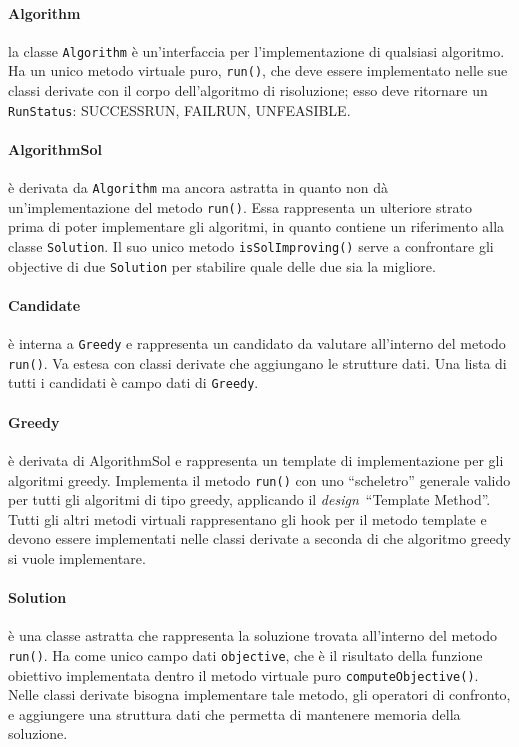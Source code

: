 \paragraph{Algorithm} la classe \texttt{Algorithm} è un'interfaccia per l'implementazione di qualsiasi algoritmo. Ha un unico metodo virtuale puro, \texttt{run()}, che deve essere implementato nelle sue classi derivate con il corpo dell'algoritmo di risoluzione; esso deve ritornare un \texttt{RunStatus}: SUCCESS\textunderscore RUN, FAIL\textunderscore RUN, UNFEASIBLE.
\paragraph{AlgorithmSol} è derivata da \texttt{Algorithm} ma ancora astratta in quanto non dà un'implementazione del metodo \texttt{run()}. Essa rappresenta un ulteriore strato prima di poter implementare gli algoritmi, in quanto contiene un riferimento alla classe \texttt{Solution}. Il suo unico metodo \texttt{isSolImproving()} serve a confrontare gli objective di due \texttt{Solution} per stabilire quale delle due sia la migliore.
\paragraph{Candidate} è interna a \texttt{Greedy} e rappresenta un candidato da valutare all'interno del metodo \texttt{run()}. Va estesa con classi derivate che aggiungano le strutture dati. Una lista di tutti i candidati è campo dati di \texttt{Greedy}.
\paragraph{Greedy} è derivata di AlgorithmSol e rappresenta un template di implementazione per gli algoritmi greedy. Implementa il metodo \texttt{run()} con uno ``scheletro'' generale valido per tutti gli algoritmi di tipo greedy, applicando il \emph{\gls{design}}\glsfirstoccur\ ``Template Method''. Tutti gli altri metodi virtuali rappresentano gli hook per il metodo template e devono essere implementati nelle classi derivate a seconda di che algoritmo greedy si vuole implementare.
\paragraph{Solution} è una classe astratta che rappresenta la soluzione trovata all'interno del metodo \texttt{run()}. Ha come unico campo dati \texttt{objective}, che è il risultato della funzione obiettivo implementata dentro il metodo virtuale puro \texttt{computeObjective()}. Nelle classi derivate bisogna implementare tale metodo, gli operatori di confronto, e aggiungere una struttura dati che permetta di mantenere memoria della soluzione.

